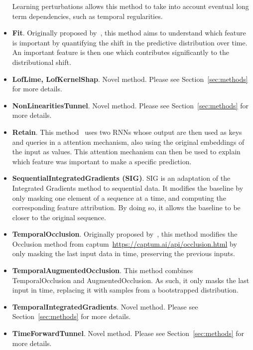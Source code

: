 \begin{itemize}
        Learning perturbations allows this method to take into account eventual long term dependencies, such as
        temporal regularities.
    \item \textbf{Fit}.
        Originally proposed by~\citep{tonekaboni2020went}, this method aims to understand which feature is important by
        quantifying the shift in the predictive distribution over time.
        An important feature is then one which contributes significantly to the distributional shift.
    \item \textbf{LofLime, LofKernelShap}.
        Novel method.
        Please see Section~\ref{sec:methods} for more details.
    \item \textbf{NonLinearitiesTunnel}.
        Novel method.
        Please see Section~\ref{sec:methods} for more details.
    \item \textbf{Retain}.
        This method~\citep{choi2016retain} uses two RNNs whose output are then used as keys and queries in a attention
        mechanism, also using the original embeddings of the input as values.
        This attention mechanism can then be used to explain which feature was important to make a specific prediction.
    \item \textbf{SequentialIntegratedGradients (SIG)}.
        SIG is an adaptation of the Integrated Gradients method to sequential data.
        It modifies the baseline by only masking one element of a sequence at a time, and computing the corresponding
        feature attribution.
        By doing so, it allows the baseline to be closer to the original sequence.
    \item \textbf{TemporalOcclusion}.
        Originally proposed by~\citep{tonekaboni2020went}, this method modifies the Occlusion method from
        captum~\url{https://captum.ai/api/occlusion.html} by only masking the last input data in time, preserving the
        previous inputs.
    \item \textbf{TemporalAugmentedOcclusion}.
        This method combines TemporalOcclusion and AugmentedOcclusion.
        As such, it only masks the last input in time, replacing it with samples from a bootstrapped distribution.
    \item \textbf{TemporalIntegratedGradients}.
        Novel method.
        Please see Section~\ref{sec:methods} for more details.
    \item \textbf{TimeForwardTunnel}.
        Novel method.
        Please see Section~\ref{sec:methods} for more details.

\end{itemize}



